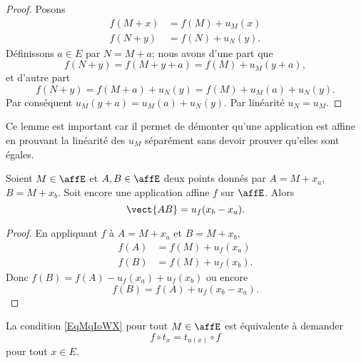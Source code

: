 \begin{proof}
    Posons
    \begin{subequations}
        \begin{align}
            f(M+x)&=f(M)+u_M(x)\\
            f(N+y)&=f(N)+u_N(y).
        \end{align}
    \end{subequations}
    Définissons \( a\in E\) par \( N=M+a\); nous avons d'une part que
    \begin{equation}
        f(N+y)=f(M+y+a)=f(M)+u_M(y+a),
    \end{equation}
    et d'autre part
    \begin{equation}
        f(N+y)=f(M+a)+u_N(y)=f(M)+u_M(a)+u_N(y).
    \end{equation}
    Par conséquent \( u_M(y+a)=u_M(a)+u_N(y)\). Par linéarité \( u_N=u_M\).
\end{proof}
Ce lemme est important car il permet de démonter qu'une application est affine en prouvant la linéarité des \( u_M\) séparément sans devoir prouver qu'elles sont égales.

\begin{lemma}       \label{LEMooXXTPooKYFGGM}
    Soient \( M\in \affE\) et \( A,B\in \affE\) deux points donnés par \( A=M+x_a\), \( B=M+x_b\). Soit encore une application affine \( f\) sur \( \affE\). Alors
    \begin{equation}
        \vect{ AB }=u_f(x_b-x_a).
    \end{equation}
\end{lemma}

\begin{proof}
    En appliquant \( f\) à \( A=M+x_a\) et \( B=M+x_b\),
    \begin{subequations}
        \begin{align}
            f(A)&=f(M)+u_f(x_a)\\
            f(B)&=f(M)+u_f(x_b).
        \end{align}
    \end{subequations}
    Donc \( f(B)=f(A)-u_f(x_a)+u_f(x_b)\) ou encore
    \begin{equation}
        f(B)=f(A)+u_f(x_b-x_a).
    \end{equation}
\end{proof}

\begin{remark}
    La condition \eqref{EqMqIoWX} pour tout \( M\in\affE\) est équivalente à demander 
    \begin{equation}
        f\circ t_x=t_{u(x)}\circ f
    \end{equation}
    pour tout \( x\in E\).
\end{remark}


